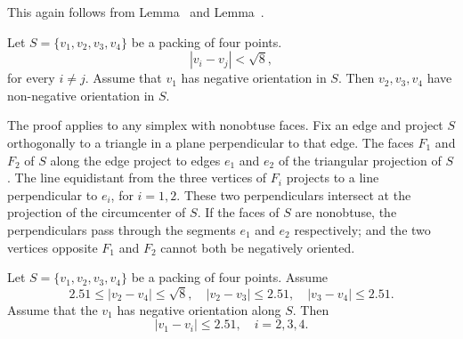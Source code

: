 \begin{tarskidata}
\begin{tarski}
\begin{proved}  This again follows from
Lemma~ and 
Lemma~.
\swallowed\end{proved}
\end{tarski}






\begin{tarski}

\begin{lemma} 
Let $S=\{v_1,v_2,v_3,v_4\}$ be a packing of four points.
   $$
   |v_i-v_j| < \sqrt8,
   $$
for every $i\ne j$.
Assume that $v_1$ has negative orientation in $S$.  Then
$v_2,v_3,v_4$ have non-negative orientation in $S$.
\end{lemma}


\begin{proved}
The proof applies to any simplex with nonobtuse faces. 
Fix an edge and project $S$ orthogonally
to a triangle in a plane perpendicular to that edge. The faces
$F_1$ and $F_2$ of $S$ along the edge project to edges $e_1$ and
$e_2$ of the triangular projection of $S$. The line equidistant
from the three vertices of $F_i$ projects to a line perpendicular
to $e_i$, for $i=1,2$. These two perpendiculars intersect at the
projection of the circumcenter of $S$.  If the faces of $S$ are
nonobtuse, the perpendiculars pass through the segments $e_1$ and
$e_2$ respectively; and the two vertices opposite $F_1$ and $F_2$ cannot both
be negatively oriented.
\swallowed\end{proved}
\end{tarski}





\begin{tarski}

\begin{lemma}
Let $S=\{v_1,v_2,v_3,v_4\}$ be a packing of four points.
Assume
 $$
 2.51\le |v_2-v_4|\le \sqrt8,\quad |v_2-v_3|\le 2.51,\quad |v_3-v_4|\le 2.51.
 $$
Assume that the $v_1$ has negative orientation
along $S$. Then
   $$
   |v_1-v_i|\le 2.51, \quad i=2,3,4.
   $$
\end{lemma}


\end{tarski}
\end{tarskidata}
